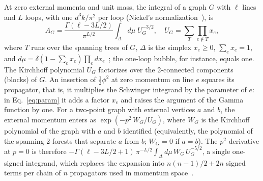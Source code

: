 At zero external momenta and unit mass, the integral of a graph $G$ with $\ell$ lines and $L$ loops, with one
$d^3k/\pi^2$ per loop (Nickel's normalization~\cite{NMB1977}), is
\begin{equation}
A_G=\frac{\Gamma(\ell-3L/2)}{\pi^{L/2}}\int_\Delta d\mu\;U_G^{-3/2},\quad U_G=\sum_{T}\prod_{e\notin T}x_e ,
\label{eq:param}
\end{equation}
where $T$ runs over the spanning trees of $G$, $\Delta$ is the simplex $x_e\ge0$, $\sum_e x_e=1$, and
$d\mu=\delta(1-\sum_e x_e)\prod_e dx_e$~\cite{BergereZuber1974,Ribeca2003thesis,BrownKreimer2013}; the one-loop bubble, for instance,
equals one. The Kirchhoff polynomial $U_G$ factorizes over the 2-connected components (blocks) of $G$. An insertion of
$\tfrac12\phi^2$ at zero momentum on line $e$ squares its propagator, that is, it multiplies the Schwinger integrand by
the parameter of $e$: in Eq.~\eqref{eq:param} it adds a factor $x_e$ and raises the argument of the Gamma function by
one. For a two-point graph with external vertices $a$ and $b$, the external momentum enters as
$\exp(-p^2\,W_G/U_G)$, where $W_G$ is the Kirchhoff polynomial of the graph with $a$ and $b$ identified (equivalently,
the polynomial of the spanning 2-forests that separate $a$ from $b$; $W_G=0$ if $a=b$). The $p^2$ derivative at
$p=0$ is therefore $-\Gamma(\ell-3L/2+1)\,\pi^{-L/2}\int_\Delta d\mu\,W_G\,U_G^{-5/2}$, a single one-signed integrand,
which replaces the expansion into $n(n-1)/2+2n$ signed terms per chain of $n$ propagators used in momentum
space~\cite{Ribeca2003thesis}.

